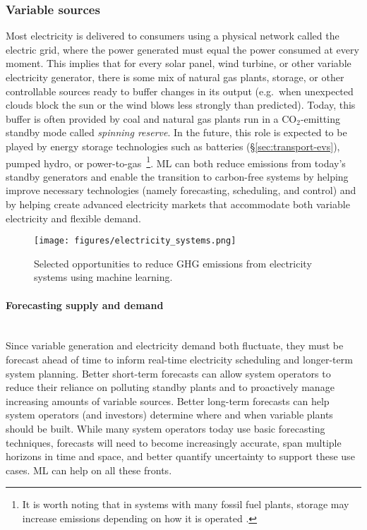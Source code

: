 \documentclass[11pt]{report}
\newcommand{\Gap}{\texorpdfstring{\hfill}{}}
\newcommand{\Rec}{\texorpdfstring{{\small\emph{\color{blue}{\fbox{High Leverage}}}}}{}}
\begin{document}
\subsubsection{Variable sources}
\label{sec:electricity-variable}
Most electricity is delivered to consumers using a physical network called the electric grid, where the power generated must equal the power consumed at every moment. This implies that for every solar panel, wind turbine, or other variable electricity generator, there is some mix of natural gas plants, storage, or other controllable sources ready to buffer changes in its output (e.g.~when unexpected clouds block the sun or the wind blows less strongly than predicted). Today, this buffer is often provided by coal and natural gas plants run in a CO$_2$-emitting standby mode called \emph{spinning reserve}. In the future, this role is expected to be played by energy storage technologies such as batteries (\S\ref{sec:transport-evs}), pumped hydro, or power-to-gas~\cite{evans2012assessment}\footnote{It is worth noting that in systems with many fossil fuel plants, storage may increase emissions depending on how it is operated \cite{hittinger2015bulk, babacan2018unintended}.}.
ML can both reduce emissions from today's standby generators and enable the transition to carbon-free systems by helping improve necessary technologies (namely forecasting, scheduling, and control) and by helping create advanced electricity markets that accommodate both variable electricity and flexible demand.

\begin{figure}
    \centering
    \texttt{[image: figures/electricity\_systems.png]}
    \caption{Selected opportunities to reduce GHG emissions from electricity systems using machine learning.}
    \label{fig:electricitySystems}
\end{figure}

\paragraph{Forecasting supply and demand}\Gap\textbf{\Rec}\mbox{}\\
Since variable generation and electricity demand both fluctuate, they must be forecast ahead of time to inform real-time electricity scheduling and longer-term system planning. Better short-term forecasts can allow system operators to reduce their reliance on polluting standby plants and to proactively manage increasing amounts of variable sources. Better long-term forecasts can help system operators (and investors) determine where and when variable plants should be built. While many system operators today use basic forecasting techniques, forecasts will need to become increasingly accurate, span multiple horizons in time and space, and better quantify uncertainty to support these use cases. ML can help on all these fronts.
\end{document}

